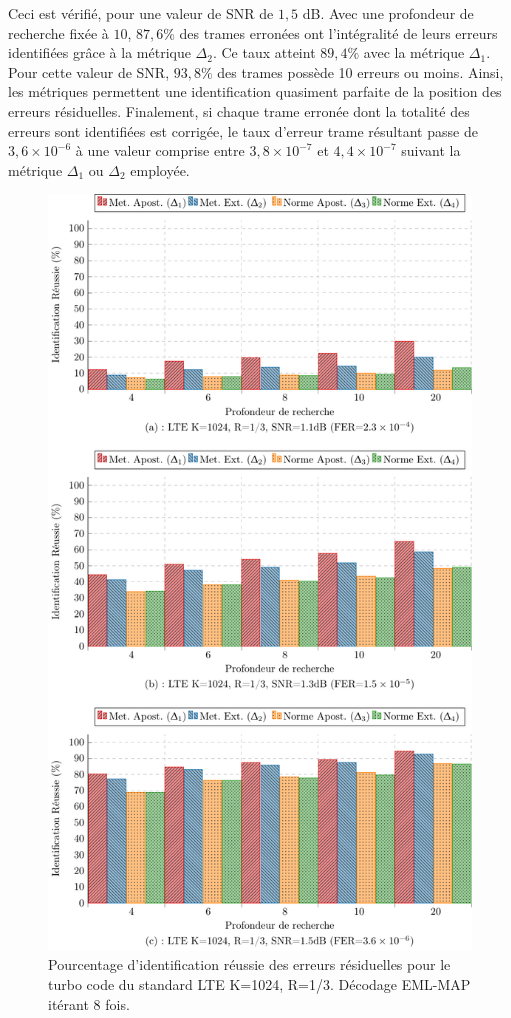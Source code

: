 Ceci est vérifié, pour une valeur de SNR de $1,5$ dB. Avec une profondeur de recherche fixée à $10$, $87,6\%$ des 
trames erronées ont l'intégralité de leurs erreurs identifiées grâce à la métrique $\Delta_2$. Ce taux atteint $89,4\%$ avec 
la métrique $\Delta_1$. Pour cette valeur de SNR, $93,8\%$ des trames possède 10 erreurs ou moins. Ainsi, les métriques 
permettent une identification quasiment parfaite de la position des erreurs résiduelles. Finalement, si chaque trame 
erronée dont la totalité des erreurs sont identifiées est corrigée, le taux d'erreur trame résultant passe de 
$3,6\times 10^{-6}$ à une valeur comprise entre $3,8\times 10^{-7}$ et $4,4\times 10^{-7}$ suivant la métrique $\Delta_1$ 
ou $\Delta_2$ employée.

\begin{figure}[!htb]
	\centering
	\includegraphics[width=.75\textwidth]{main/ch3_fig/id2/tikz/1024.pdf}
	\caption{Pourcentage d'identification réussie des erreurs résiduelles pour le turbo code du standard LTE K=1024, R=1/3.
	Décodage EML-MAP itérant 8 fois. \label{fig:id1024}}
\end{figure}
